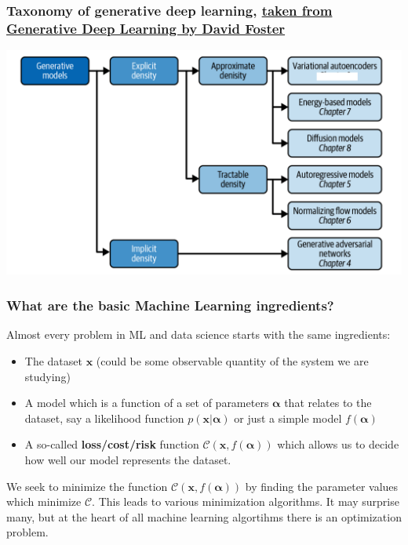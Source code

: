 \documentclass{beamer}
\begin{document}
\begin{frame}
\frametitle{Taxonomy of generative deep learning, \href{{https://www.oreilly.com/library/view/generative-deep-learning/9781098134174/ch01.html}}{taken from Generative Deep Learning by David Foster}}

\vspace{6mm}

\centerline{\includegraphics[width=1.0\linewidth]{figures/generativemodels.png}}

\vspace{6mm}
\end{frame}


\begin{frame}
\frametitle{What are the basic Machine Learning ingredients?}

\begin{block}{}
Almost every problem in ML and data science starts with the same ingredients:
\begin{itemize}
\item The dataset $\bm{x}$ (could be some observable quantity of the system we are studying)

\item A model which is a function of a set of parameters $\bm{\alpha}$ that relates to the dataset, say a likelihood  function $p(\bm{x}\vert \bm{\alpha})$ or just a simple model $f(\bm{\alpha})$

\item A so-called \textbf{loss/cost/risk} function $\mathcal{C} (\bm{x}, f(\bm{\alpha}))$ which allows us to decide how well our model represents the dataset. 
\end{itemize}

\noindent
We seek to minimize the function $\mathcal{C} (\bm{x}, f(\bm{\alpha}))$ by finding the parameter values which minimize $\mathcal{C}$. This leads to  various minimization algorithms. It may surprise many, but at the heart of all machine learning algortihms there is an optimization problem. 
\end{block}
\end{frame}
\end{document}
